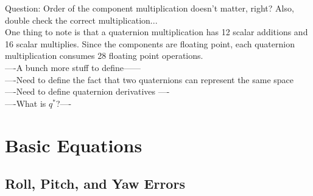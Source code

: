 \documentclass{article}
\numberwithin{equation}{section} %
\begin{document}
Question: Order of the component multiplication doesn't matter, right? Also, double check the correct multiplication... \\

One thing to note is that a quaternion multiplication has 12 scalar additions and 16 scalar multiplies. Since the components are floating point, each quaternion multiplication consumes 28 floating point operations. \\



----A bunch more stuff to define------ \\
----Need to define the fact that two quaternions can represent the same space \\
----Need to define quaternion derivatives ---- \\
----What is $q^*$?---- \\

\section{Basic Equations}
  
\subsection{Roll, Pitch, and Yaw Errors} \label{subsec:rollpitchyawerrors}
\end{document}
